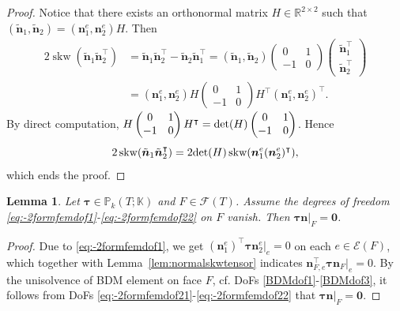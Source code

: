\documentclass[10pt]{amsart}
\newtheorem{lemma}[theorem]{Lemma}
\newcommand{\skw}{\operatorname{skw}}
\numberwithin{equation}{section}
\begin{document}
\begin{proof}
Notice that there exists an orthonormal matrix $H\in\mathbb R^{2\times2}$ such that 
$(\tilde{\boldsymbol{n}}_1, \tilde{\boldsymbol{n}}_2)=(\boldsymbol{n}_1^e, \boldsymbol{n}_2^e)H$.
Then
\begin{align*}
2\skw(\tilde{\boldsymbol{n}}_1\tilde{\boldsymbol{n}}_2^{\intercal})&=\tilde{\boldsymbol{n}}_1\tilde{\boldsymbol{n}}_2^{\intercal}-\tilde{\boldsymbol{n}}_2\tilde{\boldsymbol{n}}_1^{\intercal}=(\tilde{\boldsymbol{n}}_1, \tilde{\boldsymbol{n}}_2)\begin{pmatrix}
0 & 1 \\
-1 & 0
\end{pmatrix}\begin{pmatrix}
\tilde{\boldsymbol{n}}_1^{\intercal} \\
\tilde{\boldsymbol{n}}_2^{\intercal}  
\end{pmatrix}
\\
&=(\boldsymbol{n}_1^e, \boldsymbol{n}_2^e)H\begin{pmatrix}
0 & 1 \\
-1 & 0
\end{pmatrix}H^{\intercal}(\boldsymbol{n}_1^e, \boldsymbol{n}_2^e)^{\intercal}.
\end{align*}
By direct computation, $H\begin{pmatrix}
0 & 1 \\
-1 & 0
\end{pmatrix}H^{\intercal}={\rm det}(H)\begin{pmatrix}
0 & 1 \\
-1 & 0
\end{pmatrix}$. Hence
\[
2\skw(\tilde{\boldsymbol{n}}_1\tilde{\boldsymbol{n}}_2^{\intercal})=2{\rm det}(H)\skw(\boldsymbol{n}_1^e(\boldsymbol{n}_2^e)^{\intercal}),
\]
which ends the proof.
\end{proof}

\begin{lemma}\label{lem:-2formfemfaceunisolvence}
Let $\boldsymbol{\tau}\in\mathbb P_k(T;\mathbb K)$ and $F\in\mathcal F(T)$.
Assume the degrees of freedom \eqref{eq:-2formfemdof1}-\eqref{eq:-2formfemdof22} on $F$ vanish. 
Then $\boldsymbol{\tau}\boldsymbol{n}|_F=\boldsymbol{0}$.
\end{lemma}
\begin{proof}
Due to \eqref{eq:-2formfemdof1},  we get $(\boldsymbol{n}_1^e)^{\intercal}\boldsymbol{\tau}\boldsymbol{n}_2^e|_e=0$ on each $e\in\mathcal E(F)$, which together with Lemma~\ref{lem:normalskwtensor} indicates $\boldsymbol{n}_{F,e}^{\intercal}\boldsymbol{\tau}\boldsymbol{n}_F|_e=0$. By the unisolvence of BDM element on face $F$, cf. DoFs \eqref{BDMdof1}-\eqref{BDMdof3}, it follows from DoFs \eqref{eq:-2formfemdof21}-\eqref{eq:-2formfemdof22} that $\boldsymbol{\tau}\boldsymbol{n}|_F=\boldsymbol{0}$.
\end{proof}
\end{document}
